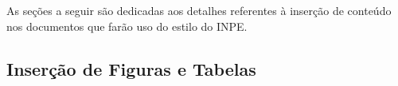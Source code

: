 %
%

As seções a seguir são dedicadas aos detalhes referentes à inserção de conteúdo nos documentos que farão uso do estilo do INPE.

\subsection{Inserção de Figuras e Tabelas}
\label{sec:figtabs}

